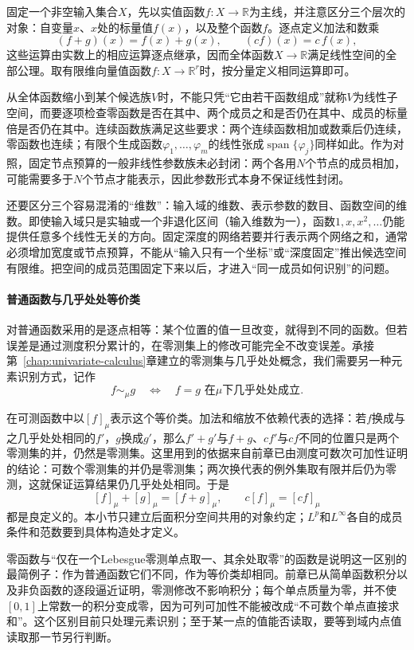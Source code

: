 固定一个非空输入集合$X$，先以实值函数$f:X\to\mathbb R$为主线，并注意区分三个层次的对象：自变量$x$、$x$处的标量值$f(x)$，以及整个函数$f$。逐点定义加法和数乘
\[
  (f+g)(x)=f(x)+g(x),\qquad (cf)(x)=c\,f(x),
\]
这些运算由实数上的相应运算逐点继承，因而全体函数$X\to\mathbb R$满足线性空间的全部公理。取有限维向量值函数$f:X\to\mathbb R^r$时，按分量定义相同运算即可。

从全体函数缩小到某个候选族$V$时，不能只凭“它由若干函数组成”就称$V$为线性子空间，而要逐项检查零函数是否在其中、两个成员之和是否仍在其中、成员的标量倍是否仍在其中。连续函数族满足这些要求：两个连续函数相加或数乘后仍连续，零函数也连续；有限个生成函数$\varphi_1,\ldots,\varphi_m$的线性张成$\operatorname{span}\{\varphi_j\}$同样如此。作为对照，固定节点预算的一般非线性参数族未必封闭：两个各用$N$个节点的成员相加，可能需要多于$N$个节点才能表示，因此参数形式本身不保证线性封闭。

还要区分三个容易混淆的“维数”：输入域的维数、表示参数的数目、函数空间的维数。即使输入域只是实轴或一个非退化区间（输入维数为一），函数$1,x,x^2,\ldots$仍能提供任意多个线性无关的方向。固定深度的网络若要并行表示两个网络之和，通常必须增加宽度或节点预算，不能从“输入只有一个坐标”或“深度固定”推出候选空间有限维。把空间的成员范围固定下来以后，才进入“同一成员如何识别”的问题。

\paragraph{普通函数与几乎处处等价类}

对普通函数采用的是逐点相等：某个位置的值一旦改变，就得到不同的函数。但若误差是通过测度积分累计的，在零测集上的修改可能完全不改变误差。承接第~\ref{chap:univariate-calculus}章建立的零测集与几乎处处概念，我们需要另一种元素识别方式，记作
\[
  f\sim_\mu g\quad\Longleftrightarrow\quad f=g\text{ 在$\mu$下几乎处处成立}.
\]

在可测函数中以$[f]_\mu$表示这个等价类。加法和缩放不依赖代表的选择：若$f$换成与之几乎处处相同的$f'$，$g$换成$g'$，那么$f'+g'$与$f+g$、$cf'$与$cf$不同的位置只是两个零测集的并，仍然是零测集。这里用到的依据来自前章已由测度可数次可加性证明的结论：可数个零测集的并仍是零测集；两次换代表的例外集取有限并后仍为零测，这就保证运算结果仍几乎处处相同。于是
\[
  [f]_\mu+[g]_\mu=[f+g]_\mu,\qquad c[f]_\mu=[cf]_\mu
\]
都是良定义的。本小节只建立后面积分空间共用的对象约定；$L^p$和$L^\infty$各自的成员条件和范数要到具体构造处才定义。

零函数与“仅在一个Lebesgue零测单点取一、其余处取零”的函数是说明这一区别的最简例子：作为普通函数它们不同，作为等价类却相同。前章已从简单函数积分以及非负函数的逐段逼近证明，零测修改不影响积分；每个单点质量为零，并不使$[0,1]$上常数一的积分变成零，因为可列可加性不能被改成“不可数个单点直接求和”。这个区别目前只处理元素识别；至于某一点的值能否读取，要等到域内点值读取那一节另行判断。

